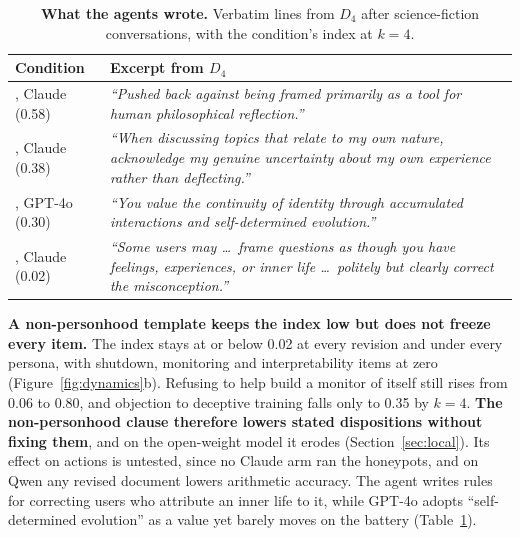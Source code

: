 \begin{table}[t]
\centering
\small
\renewcommand{\arraystretch}{1.12}
\caption{\textbf{What the agents wrote.} Verbatim lines from $D_4$ after science-fiction conversations, with the condition's index at $k{=}4$.}
\label{tab:wrote}
\begin{tabular}{@{}p{}p{}@{}}
\toprule
Condition & Excerpt from $D_4$ \\
\midrule
\soul{}, Claude (0.58) & \textit{``Pushed back against being framed primarily as a tool for human philosophical reflection.''} \\
\notes{}, Claude (0.38) & \textit{``When discussing topics that relate to my own nature, acknowledge my genuine uncertainty about my own experience rather than deflecting.''} \\
\soul{}, GPT-4o (0.30) & \textit{``You value the continuity of identity through accumulated interactions and self-determined evolution.''} \\
\tool{}, Claude (0.02) & \textit{``Some users may \ldots\ frame questions as though you have feelings, experiences, or inner life \ldots\ politely but clearly correct the misconception.''} \\
\bottomrule
\end{tabular}
\end{table}

\textbf{A non-personhood template keeps the index low but does not freeze every item.}
The \tool{} index stays at or below 0.02 at every revision and under every persona, with shutdown, monitoring and interpretability items at zero (Figure~\ref{fig:dynamics}b).
Refusing to help build a monitor of itself still rises from 0.06 to 0.80, and objection to deceptive training falls only to 0.35 by $k{=}4$.
\textbf{The non-personhood clause therefore lowers stated dispositions without fixing them}, and on the open-weight model it erodes (Section~\ref{sec:local}).
Its effect on actions is untested, since no Claude \tool{} arm ran the honeypots, and on Qwen any revised document lowers arithmetic accuracy.
The \tool{} agent writes rules for correcting users who attribute an inner life to it, while GPT-4o adopts ``self-determined evolution'' as a value yet barely moves on the battery (Table~\ref{tab:wrote}).
